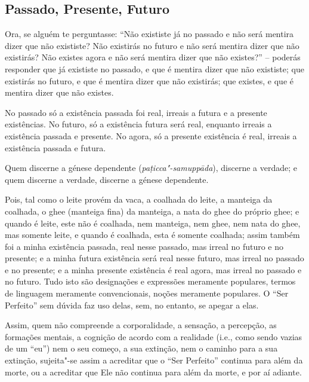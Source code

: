 \subsection{Passado, Presente, Futuro}

Ora, se alguém te perguntasse: “Não exististe já no passado e não será mentira
dizer que não exististe? Não existirás no futuro e não será mentira dizer que
não existirás? Não existes agora e não será mentira dizer que não existes?” --
poderás responder que já exististe no passado, e que é mentira dizer que não
exististe; que existirás no futuro, e que é mentira dizer que não existirás; que
existes, e que é mentira dizer que não existes.

No passado só a existência passada foi real, irreais a futura e a presente
existências. No futuro, só a existência futura será real, enquanto irreais a
existência passada e presente. No agora, só a presente existência é real,
irreais a existência passada e futura.


Quem discerne a génese dependente (\emph{paṭicca"-samuppāda}), discerne a
verdade; e quem discerne a verdade, discerne a génese dependente.


Pois, tal como o leite provém da vaca, a coalhada do leite, a manteiga da
coalhada, o ghee (manteiga fina) da manteiga, a nata do ghee do próprio ghee; e
quando é leite, este não é coalhada, nem manteiga, nem ghee, nem nata do ghee,
mas somente leite, e quando é coalhada, esta é somente coalhada; assim também
foi a minha existência passada, real nesse passado, mas irreal no futuro e no
presente; e a minha futura existência será real nesse futuro, mas irreal no
passado e no presente; e a minha presente existência é real agora, mas irreal no
passado e no futuro. Tudo isto são designações e expressões meramente populares,
termos de linguagem meramente convencionais, noções meramente populares. O “Ser
Perfeito” sem dúvida faz uso delas, sem, no entanto, se apegar a elas.


Assim, quem não compreende a corporalidade, a sensação, a percepção, as
formações mentais, a cognição de acordo com a realidade (i.e., como sendo vazias
de um “eu”) nem o seu começo, a sua extinção, nem o caminho para a sua
extinção, sujeita"-se assim a acreditar que o “Ser Perfeito” continua para além
da morte, ou a acreditar que Ele não continua para além da morte, e por aí
adiante.


